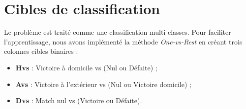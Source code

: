 \section{Cibles de classification}
Le problème est traité comme une classification multi-classes. Pour faciliter 
l'apprentissage, nous avons implémenté la méthode \textit{One-vs-Rest} en créant 
trois colonnes cibles binaires :
\begin{itemize}
    \item \textbf{Hvs} : Victoire à domicile vs (Nul ou Défaite) ;
    \item \textbf{Avs} : Victoire à l'extérieur vs (Nul ou Victoire domicile) ;
    \item \textbf{Dvs} : Match nul vs (Victoire ou Défaite).
\end{itemize}